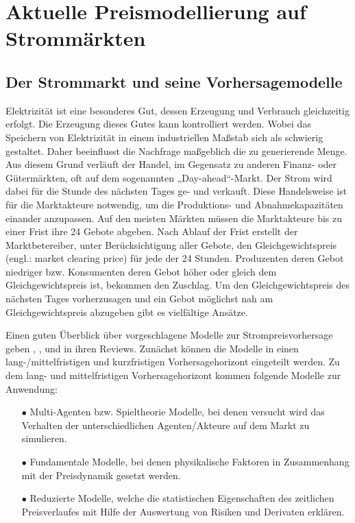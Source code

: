 

\section{Aktuelle Preismodellierung auf Strommärkten}\label{sec:strompreis}


\subsection{Der Strommarkt und seine Vorhersagemodelle}

Elektrizität ist eine besonderes Gut, dessen Erzeugung und Verbrauch gleichzeitig erfolgt. Die Erzeugung dieses Gutes kann kontrolliert werden. Wobei das Speichern von Elektrizität in einem industriellen Maßstab sich als schwierig gestaltet. Daher beeinflusst die Nachfrage maßgeblich die zu generierende Menge. Aus diesem Grund verläuft der Handel, im Gegensatz zu anderen Finanz- oder Gütermärkten, oft auf dem sogenannten „Day-ahead“-Markt. Der Strom wird dabei für die Stunde des nächsten Tages ge- und verkauft. Diese Handelsweise ist für die Marktakteure notwendig, um die Produktions- und Abnahmekapazitäten einander anzupassen. Auf den meisten Märkten müssen die Marktakteure bis zu einer Frist ihre 24 Gebote abgeben. Nach Ablauf der Frist erstellt der Marktbetereiber, unter Berücksichtigung aller Gebote, den Gleichgewichtspreis (engl.: market clearing price) für jede der 24 Stunden. Produzenten deren Gebot niedriger bzw. Konsumenten deren Gebot höher oder gleich dem Gleichgewichtspreis ist, bekommen den Zuschlag. Um den Gleichgewichtspreis des nächsten Tages vorherzusagen und ein Gebot möglichst nah am Gleichgewichtspreis abzugeben gibt es vielfältige Ansätze.

Einen guten Überblick über vorgeschlagene Modelle zur Strompreisvorhersage geben \citet{Aggarwal2009}, \citet{Cerjan2013}, \citet{Weron2014} und \citet{Panapakidis2016} in ihren Reviews. Zunächst können die Modelle in einen lang-/mittelfristigen und kurzfristigen Vorhersagehorizont eingeteilt werden. Zu dem lang- und mittelfristigen Vorhersagehorizont kommen folgende Modelle zur Anwendung:
\begin{itemize}
\item[\textbf{$\bullet$}]%
Multi-Agenten bzw. Spieltheorie Modelle, bei denen versucht wird das Verhalten der unterschiedlichen Agenten/Akteure auf dem Markt zu simulieren.

\item[\textbf{$\bullet$}]%
Fundamentale Modelle, bei denen physikalische Faktoren in Zusammenhang mit der Preisdynamik gesetzt werden.

\item[\textbf{$\bullet$}]%
Reduzierte Modelle, welche die statistischen Eigenschaften des zeitlichen Preisverlaufes mit Hilfe der Auswertung von Risiken und Derivaten erklären.
\end{itemize}

